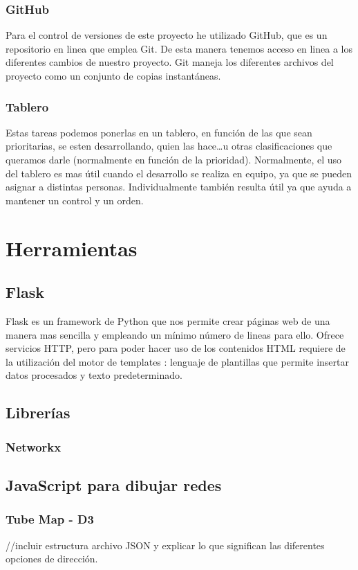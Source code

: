 \subsubsection{GitHub}
Para el control de versiones de este proyecto he utilizado GitHub, que es un repositorio en linea que emplea Git. De esta manera tenemos acceso en linea a los diferentes cambios de nuestro proyecto.
Git maneja los diferentes archivos del proyecto como un conjunto de copias instantáneas. 

\subsubsection{Tablero}
Estas tareas podemos ponerlas en un tablero, en función de las que sean prioritarias, se esten desarrollando, quien las hace\dots u otras clasificaciones que queramos darle (normalmente en función de la prioridad).
Normalmente, el uso del tablero es mas útil cuando el desarrollo se realiza en equipo, ya que se pueden asignar a distintas personas. Individualmente también resulta útil ya que ayuda a mantener un control y un orden.

\section{Herramientas}
\subsection{Flask}
Flask es un framework de Python que nos permite crear páginas web de una manera mas sencilla y empleando un mínimo número de lineas para ello. Ofrece servicios HTTP, pero para poder hacer uso de los contenidos HTML requiere de la utilización del motor de templates \cite{Jinja2}: lenguaje de plantillas que permite insertar datos procesados y texto predeterminado.

\subsection{Librerías}

\subsubsection{Networkx}
\subsection{JavaScript para dibujar redes}
\subsubsection{Tube Map - D3}
//incluir estructura archivo JSON y explicar lo que significan las diferentes opciones de dirección.

